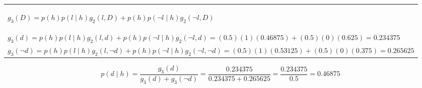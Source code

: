 \begin{example}
\begin{enumerate}
\begin{center}
\begin{tabular}{l}
                \midrule
                \multicolumn{1}{p{\linewidth}}{
                \begin{center}
                    $g_3(D) = p(h) p(l \mid h) g_2(l,D) + p(h) p(\lnot l \mid h) g_2(\lnot l, D)$ 
                \end{center}} \\
                $g_3(d) = p(h) p(l \mid h) g_2(l,d) + p(h) p(\lnot l \mid h) g_2(\lnot l,d) = (0.5)(1)(0.46875) + (0.5)(0)(0.625) = 0.234375$ \\
                $g_3(\lnot d) = p(h) p(l \mid h) g_2(l,\lnot d) + p(h) p(\lnot l \mid h) g_2(\lnot l,\lnot d) = (0.5)(1)(0.53125) + (0.5)(0)(0.375) = 0.265625$ \\
                \bottomrule
            \end{tabular}
        \end{center}
        \vspace{1em}

        \begin{equation*}
            p(d \mid h) = \frac{g_3(d)}{g_3(d) + g_3(\lnot d)} = \frac{0.234375}{0.234375 + 0.265625} = \frac{0.234375}{0.5} = 0.46875
        \end{equation*}
    \end{enumerate}
\end{example}
\newpage

